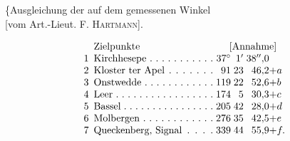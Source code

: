 \vspace*{2.8\baselineskip}
{\centering
[4.]\par\medskip
\{Ausgleichung der auf dem  gemessenen Winkel\\
{[}vom Art.-Lieut. F. \textsc{Hartmann}].\par}
\[
\begin{array}{@{}r@{\enspace}l@{\;}r@{\;}r@{\;}r@{}l@{}}
 &\text{Zielpunkte}&\multicolumn{4}{c@{}}{\text{[Annahme]}}\\
 1&\text{\hbox to 12em{Kirchhesepe\hfil.\hfil.\hfil.\hfil.\hfil.\hfil.\hfil.\hfil.\hfil.\hfil.\hfil.}}&37^\circ&1'&38''{,}0&\\
 2&\text{\hbox to 12em{Kloster ter Apel\hfil.\hfil.\hfil.\hfil.\hfil.\hfil.\hfil.}}&91&23&46{,}2&+a\\
 3&\text{\hbox to 12em{Onstwedde\hfil.\hfil.\hfil.\hfil.\hfil.\hfil.\hfil.\hfil.\hfil.\hfil.\hfil.\hfil.}}&119&22&52{,}6&+b\\
 4&\text{\hbox to 12em{Leer\hfil.\hfil.\hfil.\hfil.\hfil.\hfil.\hfil.\hfil.\hfil.\hfil.\hfil.\hfil.\hfil.\hfil.\hfil.\hfil.\hfil.}}&174&5&30{,}3&+c\\
 5&\text{\hbox to 12em{Bassel\hfil.\hfil.\hfil.\hfil.\hfil.\hfil.\hfil.\hfil.\hfil.\hfil.\hfil.\hfil.\hfil.\hfil.\hfil.\hfil.}}&205&42&28{,}0&+d\\
 6&\text{\hbox to 12em{Molbergen\hfil.\hfil.\hfil.\hfil.\hfil.\hfil.\hfil.\hfil.\hfil.\hfil.\hfil.\hfil.}}&276&35&42{,}5&+e\\
 7&\text{\hbox to 12em{Queckenberg, Signal\hfil.\hfil.\hfil.\hfil.}}&339&44&55{,}9&+f.
\end{array}
\]
